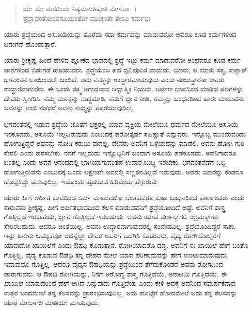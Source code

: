 \begin{verse}
ಯೇ ಮೇ ಮತಮಿದಂ ನಿತ್ಯಮನುತಿಷ್ಠಂತಿ ಮಾನವಾಃ~।\\ಶ್ರದ್ಧಾವಂತೋಽನಸೂಯಂತೋ ಮುಚ್ಯಂತೇ ತೇಽಪಿ ಕರ್ಮಭಿಃ 
\end{verse}

{\small ಯಾರು ಶ್ರದ್ಧೆಯಿಂದ ಅಸೂಯೆಯನ್ನು ತೊರೆದು ಸದಾ ಕರ್ಮವನ್ನು ಮಾಡುವರೋ ಅವರೂ ಕೂಡ ಕರ್ಮಗಳಿಂದ ಬಿಡುಗಡೆ ಹೊಂದುತ್ತಾರೆ.}

ಯಾರು ಶ‍್ರೀಕೃಷ್ಣ ಹಿಂದೆ ಹೇಳಿದ ಶ್ಲೋಕದ ಭಾವದಲ್ಲಿ ಶ್ರದ್ಧೆ ಇಟ್ಟು ಕರ್ಮ ಮಾಡುವರೋ ಅಂಥವರೂ ಕೂಡ ಕರ್ಮ ಪಾಶಗಳಿಂದ ಬಿಡುಗಡೆ ಹೊಂದುವರು. ಶ್ರದ್ಧೆಯೆಂಬ ಪದ ಧ್ವನಿಪೂರಿತ ವಾದುದು. ಯಾರು, ಆ ಮಾತು ಸತ್ಯ, ಸಾಕ್ಷಾತ್ ಭಗವಂತನ ಬಾಯಿಂದಲೇ ಬಂದಿದೆ, ಅದು ನಮ್ಮನ್ನು ಉದ್ಧಾರಮಾಡುವುದು ಎಂದು ನಂಬುತ್ತಾರೋ ಅವರು ಉದ್ಧಾರವಾಗುವರು. ಈ ಒಂದು ತತ್ತ್ವ ಅಗಾಧವಾದ ಆಧ್ಯಾತ್ಮಿಕ ನಿಯಮ. ಅರ್ಪಣ ಭಾವದಿಂದ ಮಾಡಿದ ಫಲಗಳನ್ನು ದೇವರು ಸ್ವೀಕರಿಸಿ, ನಮ್ಮ ಮನಸ್ಸನ್ನು ಶುದ್ಧಮಾಡಿ, ನಮಗೆ ಜ್ಞಾನ ನೀಡಿ, ನಮ್ಮನ್ನು ಬಂಧನದಿಂದ ಪಾರು ಮಾಡುವನು. ಅವನನ್ನು ನಂಬಿ ನಡೆದರೆ ಅವನು ನಮ್ಮನ್ನು ತೊರೆಯುವುದಿಲ್ಲ.

ಭಗವಂತನಲ್ಲಿ ಇಡುವ ಶ್ರದ್ಧೆಯ ಜೊತೆಗೆ ಭಕ್ತರಲ್ಲಿ ಯಾವ ವ್ಯಕ್ತಿಯ ಮೇಲೆಯೂ ಧರ್ಮದ ಮೇಲೆಯೂ ಅಸೂಯೆ ಇರಕೂಡದು, ಅಸೂಯೆ ಇಲ್ಲದಿರುವುದು ಎಂಬುದಕ್ಕೆ ಪರೋತ್ಕರ್ಷ ಸಹಿಷ್ಣುತೆ ಎನ್ನುವರು. ಇನ್ನೊಬ್ಬ ಮುಂದುವರಿದು ಹೋಗುತ್ತಿದ್ದರೆ ಅವನನ್ನು ನೋಡಿ ಕರುಬು ವುದಲ್ಲ, ದೇವರು ಅವನಿಗೆ ಒಳ್ಳೆಯದನ್ನು ಮಾಡಲಿ, ಅವನು ಹೋಗಿ ಗುರಿ ಸೇರಲಿ ಎಂದು ಹರಸಬೇಕು. ನನಗೆ ಇಲ್ಲದುದು ಇನ್ನೊಬ್ಬನಿಗೆ ಬಂದಾಗ ಅಸೂಯೆ ಪಡಕೂಡದು. ಅವನಿಗಾದರೂ ಬಂತಲ್ಲ ಎಂದು ಅವನ ಆನಂದದಲ್ಲಿ ಭಾಗಿಯಾಗುವಂತಹ ಉದಾರ ಬುದ್ಧಿ ಇರಬೇಕು. ಭಗವಂತನೆಡೆಗೆ ಒಬ್ಬ ಹೋಗುತ್ತಿರುವನು ಎಂಬುದಕ್ಕೆ ಒಂದು ಲಕ್ಷಣವೇ ಅವನಲ್ಲಿ ಸಣ್ಣತನವಿಲ್ಲದೆ ಇರುವುದು. ಅವನು ಯಾರನ್ನು ಕಂಡರೂ ಹೊಟ್ಟೆಕಿಚ್ಚು ಪಡುವುದಿಲ್ಲ. ಇದೊಂದು ಹೃದಯದ ಹಿರಿಮೆಯ ಹೆಗ್ಗುರುತು.

ಯಾರು ಹೀಗೆ ಅರ್ಪಿತ ಭಾವದಿಂದ ಕರ್ಮ ಮಾಡುವರೋ ಅಂತಹವರೂ ಕೂಡ ಬಂಧನದಿಂದ ಪಾರಾಗುವರು ಎಂದು ಸಾರುವನು ಶ‍್ರೀಕೃಷ್ಣ. ಹೀಗೆ ಅರ್ಪಿತಭಾವದಿಂದ ಕೆಲಸ ಮಾಡುವವನಿಗೆ ಶ್ರದ್ಧೆಯೊಂದಿದೆ ಅಷ್ಟೆ. ಅವನಿಗೆ ಶಾಸ್ತ್ರ ಗೊತ್ತಿಲ್ಲದೆ ಇರಬಹುದು, ಜ್ಞಾನ ಗೊತ್ತಿಲ್ಲದೆ ಇರಬಹುದು. ಅವನು ಯಾವ ವರ್ಣಕ್ಕಾಗಲಿ ಆಶ್ರಮಕ್ಕಾಗಲಿ ಸೇರಿರಬಹುದು. ಆದರೂ ಚಿಂತೆಯಿಲ್ಲ. ಅವನು ಉದ್ಧಾರವಾಗುವುದರಲ್ಲಿ ಸಂದೇಹವಿಲ್ಲ. ಶ್ರದ್ಧೆಯೊಂದಿದ್ದರೆ ಸಾಕು, ಇನ್ನು ಏನೇನು ಆವಶ್ಯಕವೋ ಅದನ್ನೆಲ್ಲಾ ದೇವರೆ ಅವನಿಗೆ ಒದಗಿಸಿ ಕೊಡುವನು. ವೈದ್ಯ ರೋಗಿಯೊಬ್ಬನಿಗೆ ಯಾವುದೋ ಖಾಯಿಲೆಗೆ ಎಂದು ಔಷಧಿ ಕೊಡುತ್ತಾನೆ. ರೋಗಿಯಾದರೊ ದಡ್ಡ. ಅವನಿಗೆ ಈ ಖಾಯಿಲೆ ಹೇಗೆ ಬಂತೊ ಗೊತ್ತಿಲ್ಲ. ವೈದ್ಯ ಕೊಡುವ ಔಷಧಿ ತನ್ನ ದೇಹದ ಮೇಲೆ ಯಾವ ಪರಿಣಾಮವನ್ನು ಹೇಗೆ ಉಂಟುಮಾಡುವುದು, ಇದಾವುದೂ ಗೊತ್ತಿಲ್ಲ. ಆದರೂ ವೈದ್ಯನ ಔಷಧಿಯನ್ನು ಶ್ರದ್ಧೆಯಿಂದ ತೆಗೆದುಕೊಂಡರೆ ಅವನು ರೋಗದಿಂದ ಪಾರಾಗುವನು. ಆ ಔಷಧಿ ರೋಗಿಯನ್ನು, ನಿನಗೆ ಆರೋಗ್ಯ ಶಾಸ್ತ್ರ ಗೊತ್ತಿದೆಯೆ, ಅನಾಟಮಿ ಗೊತ್ತಿದೆಯೆ, ಈ ಖಾಯಿಲೆ ಯಾವುದರಿಂದ ಹೇಗೆ ಆಗಿದೆ ಎನ್ನುವುದು ಗೊತ್ತಿದೆಯೆ ಎಂದು ಕೇಳಿ ಅದಕ್ಕೆ ಅವನಿಂದ ಸಮರ್ಪಕವಾದ ಉತ್ತರ ಬಂದಮೇಲೆ ತನ್ನ ಕೆಲಸವನ್ನು ಪ್ರಾರಂಭಿಸುವುದಿಲ್ಲ. ಅದು ಹೊಟ್ಟೆಗೆ ಹೋದಮೇಲೆ ಅದು ತನ್ನ ಕೆಲಸವನ್ನು ಯಾರ ಮೇಲಾಗಲಿ ಮಾಡಿಯೇ ಮಾಡುವುದು.

